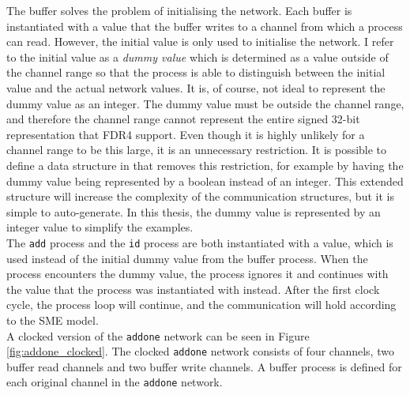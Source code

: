 The buffer solves the problem of initialising the network. Each buffer is instantiated with a value that the buffer writes to a channel from which a process can read. However, the initial value is only used to initialise the network. I refer to the initial value as a \textit{dummy value} which is determined as a value outside of the channel range so that the process is able to distinguish between the initial value and the actual network values.
It is, of course, not ideal to represent the dummy value as an integer. The dummy value must be outside the channel range, and therefore the channel range cannot represent the entire signed 32-bit representation that FDR4 support. Even though it is highly unlikely for a channel range to be this large, it is an unnecessary restriction. It is possible to define a data structure in \cspm{} that removes this restriction, for example by having the dummy value being represented by a boolean instead of an integer. This extended structure will increase the complexity of the communication structures, but it is simple to auto-generate.
In this thesis, the dummy value is represented by an integer value to simplify the examples.\\

The \texttt{add} process and the \texttt{id} process are both instantiated with a value, which is used instead of the initial dummy value from the buffer process. When the process encounters the dummy value, the process ignores it and continues with the value that the process was instantiated with instead. After the first clock cycle, the process loop will continue, and the communication will hold according to the SME model.\\

A clocked version of the \texttt{addone} network can be seen in Figure \ref{fig:addone_clocked}. The clocked \texttt{addone} network consists of four channels, two buffer read channels and two buffer write channels. A buffer process is defined for each original channel in the \texttt{addone} network. \\


